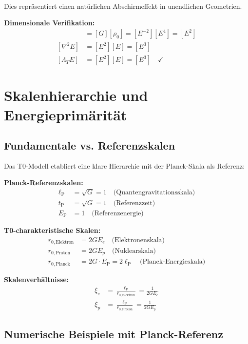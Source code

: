 \documentclass[12pt,a4paper]{report}
\newcommand{\EP}{E_{\text{P}}}            %
\newcommand{\lP}{\ell_{\text{P}}}         %
\newcommand{\tP}{t_{\text{P}}}            %
\newcommand{\Lambdat}{\Lambda_T}          %
\begin{document}
	Dies repräsentiert einen natürlichen Abschirmeffekt in unendlichen Geometrien.
	
	\textbf{Dimensionale Verifikation:}
	\begin{align}
		[\Lambdat] &= [G][\rho_0] = [E^{-2}][E^4] = [E^2] \\
		[\nabla^2 E] &= [E^2][E] = [E^3] \\
		[\Lambdat E] &= [E^2][E] = [E^3] \quad \checkmark
	\end{align}
	
	\section{Skalenhierarchie und Energieprimärität}\label{sec:scale_hierarchy}
	
	\subsection{Fundamentale vs. Referenzskalen}\label{subsec:fundamental_vs_reference}
	
	Das T0-Modell etabliert eine klare Hierarchie mit der Planck-Skala als Referenz:
	
	\textbf{Planck-Referenzskalen:}
	\begin{align}
		\lP &= \sqrt{G} = 1 \quad \text{(Quantengravitationsskala)} \\
		\tP &= \sqrt{G} = 1 \quad \text{(Referenzzeit)} \\
		\EP &= 1 \quad \text{(Referenzenergie)}
	\end{align}
	
	\textbf{T0-charakteristische Skalen:}
	\begin{align}
		r_{0,\text{Elektron}} &= 2GE_e \quad \text{(Elektronenskala)} \\
		r_{0,\text{Proton}} &= 2GE_p \quad \text{(Nuklearskala)} \\
		r_{0,\text{Planck}} &= 2G \cdot \EP = 2\lP \quad \text{(Planck-Energieskala)}
	\end{align}
	
	\textbf{Skalenverhältnisse:}
	\begin{align}
		\xi_{e} &= \frac{\lP}{r_{0,\text{Elektron}}} = \frac{1}{2GE_e} \\
		\xi_{p} &= \frac{\lP}{r_{0,\text{Proton}}} = \frac{1}{2GE_p}
	\end{align}
	
	\subsection{Numerische Beispiele mit Planck-Referenz}\label{subsec:numerical_examples}
	
\end{document}
